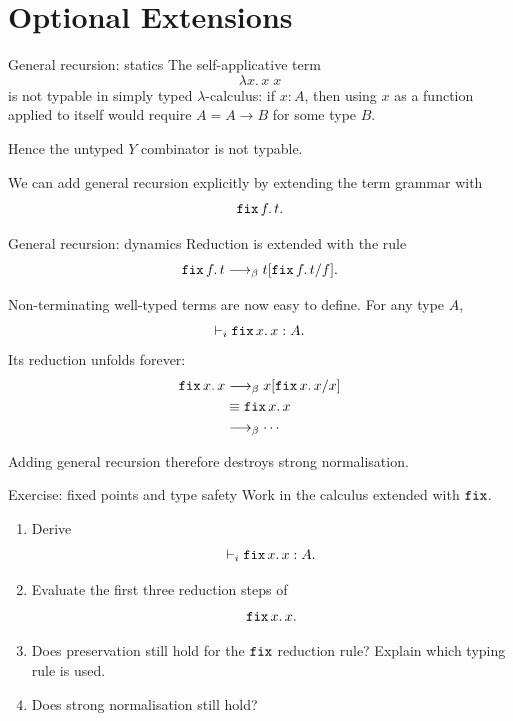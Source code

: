 \section{Optional Extensions}

\begin{frame}{General recursion: statics}
  The self-applicative term
  \[
    \lambda x.\,x\;x
  \]
  is not typable in simply typed $\lambda$-calculus: if $x : A$, then using
  $x$ as a function applied to itself would require $A = A \to B$ for some
  type $B$.

  Hence the untyped $Y$ combinator is not typable.

  \vfill

  We can add general recursion explicitly by extending the term grammar with
  \[
    \mathtt{fix}\,f.\,t.
  \]

  \begin{prooftree}
  \end{prooftree}
\end{frame}

\begin{frame}{General recursion: dynamics}
  Reduction is extended with the rule
  \[
    \mathtt{fix}\,f.\,t \longrightarrow_{\beta} t[{\mathtt{fix}\,f.\,t}/{f}].
  \]

  \vfill

  Non-terminating well-typed terms are now easy to define.  For any type $A$,
  \[
    \vdash_i \mathtt{fix}\,x.\,x : A.
  \]
  Its reduction unfolds forever:
  \begin{align*}
    \mathtt{fix}\,x.\,x
      &\longrightarrow_{\beta} x[{\mathtt{fix}\,x.\,x}/{x}] \\
      &\equiv \mathtt{fix}\,x.\,x \\
      &\longrightarrow_{\beta} \cdots
  \end{align*}

  Adding general recursion therefore destroys strong normalisation.
\end{frame}

\begin{frame}{Exercise: fixed points and type safety}
  Work in the calculus extended with $\mathtt{fix}$.

  \begin{enumerate}
    \item Derive
      \[
        \vdash_i \mathtt{fix}\,x.\,x : A.
      \]

    \item Evaluate the first three reduction steps of
      \[
        \mathtt{fix}\,x.\,x.
      \]

    \item Does preservation still hold for the $\mathtt{fix}$ reduction rule?
      Explain which typing rule is used.

    \item Does strong normalisation still hold?
  \end{enumerate}
\end{frame}

